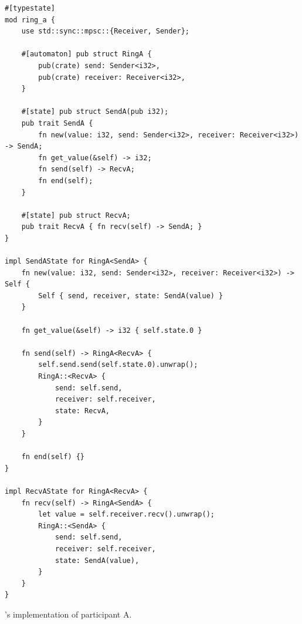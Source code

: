 \begin{listing}
    \begin{verbatim}
#[typestate]
mod ring_a {
    use std::sync::mpsc::{Receiver, Sender};

    #[automaton] pub struct RingA {
        pub(crate) send: Sender<i32>,
        pub(crate) receiver: Receiver<i32>,
    }

    #[state] pub struct SendA(pub i32);
    pub trait SendA {
        fn new(value: i32, send: Sender<i32>, receiver: Receiver<i32>) -> SendA;
        fn get_value(&self) -> i32;
        fn send(self) -> RecvA;
        fn end(self);
    }

    #[state] pub struct RecvA;
    pub trait RecvA { fn recv(self) -> SendA; }
}

impl SendAState for RingA<SendA> {
    fn new(value: i32, send: Sender<i32>, receiver: Receiver<i32>) -> Self {
        Self { send, receiver, state: SendA(value) }
    }

    fn get_value(&self) -> i32 { self.state.0 }

    fn send(self) -> RingA<RecvA> {
        self.send.send(self.state.0).unwrap();
        RingA::<RecvA> {
            send: self.send,
            receiver: self.receiver,
            state: RecvA,
        }
    }

    fn end(self) {}
}

impl RecvAState for RingA<RecvA> {
    fn recv(self) -> RingA<SendA> {
        let value = self.receiver.recv().unwrap();
        RingA::<SendA> {
            send: self.send,
            receiver: self.receiver,
            state: SendA(value),
        }
    }
}
    \end{verbatim}
    \caption{'s implementation of participant A.}
    \label{lst:typestate-ring-starter}
\end{listing}

